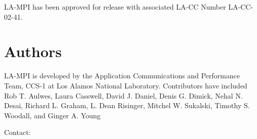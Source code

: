 \documentclass[english]{article}
\begin{document}
LA-MPI has been approved for release with associated LA-CC Number
LA-CC-02-41.

\section{Authors}

LA-MPI is developed by the Application Communications and Performance
Team, CCS-1 at Los Alamos National Laboratory.  Contributors have
included Rob T. Aulwes, Laura Casswell, David J. Daniel, Denis
G. Dimick, Nehal N. Desai, Richard L. Graham, L. Dean Risinger,
Mitchel W. Sukalski, Timothy S. Woodall, and Ginger A. Young

Contact: 

\LatexManEnd
\end{document}
